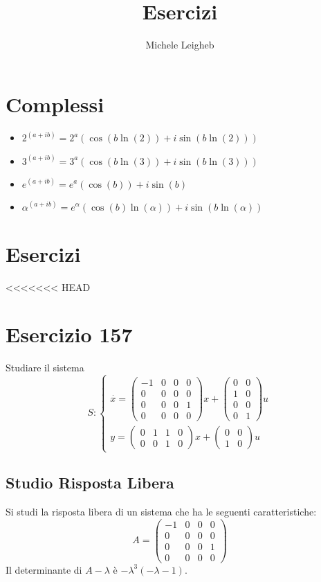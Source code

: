 \documentclass{article}
\title{Esercizi}
\author{Michele Leigheb}
\date{}
\begin{document}
\maketitle
\tableofcontents{}
\section{Complessi}
\begin{itemize}
	\item \(\displaystyle 2^{(a+ib)} = 2^a (\cos(b \ln(2)) + i\sin(b \ln(2))) \)
	\item \(\displaystyle 3^{(a+ib)} = 3^a (\cos(b \ln(3)) + i\sin(b \ln(3))) \)
	\item \(\displaystyle e^{(a+ib)} = e^a (\cos(b)) + i\sin(b) \)
	\item \(\displaystyle \alpha^{(a+ib)} = e^{\alpha} (\cos(b)\ln(\alpha)) + i\sin(b\ln(\alpha)) \)
\end{itemize}



\section{Esercizi}

<<<<<<< HEAD
\section{Esercizio 157 }
 Studiare il sistema \[S:\begin{cases}\overset{\cdot}{x} = \left(\begin{matrix}-1 & 0 & 0 & 0\\0 & 0 & 0 & 0\\0 & 0 & 0 & 1\\0 & 0 & 0 & 0\end{matrix}\right) x+ \left(\begin{matrix}0 & 0\\1 & 0\\0 & 0\\0 & 1\end{matrix}\right)u\\y = \left(\begin{matrix}0 & 1 & 1 & 0\\0 & 0 & 1 & 0\end{matrix}\right) x +\left(\begin{matrix}0 & 0\\1 & 0\end{matrix}\right) u\end{cases}\]\subsection{Studio Risposta Libera}
Si studi la risposta libera di un sistema che ha le seguenti caratteristiche: \[A = \left(\begin{matrix}-1 & 0 & 0 & 0\\0 & 0 & 0 & 0\\0 & 0 & 0 & 1\\0 & 0 & 0 & 0\end{matrix}\right)\]
Il determinante di $A-\lambda$ è $ - \lambda^{3} \left(- \lambda - 1\right) $.
\end{document}
